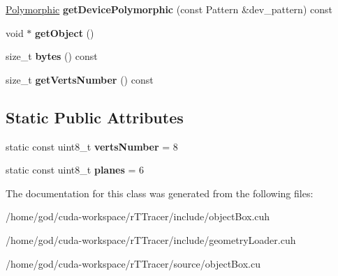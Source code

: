 \begin{DoxyCompactItemize}
\item 
\hyperlink{struct_polymorphic}{Polymorphic} {\bfseries get\+Device\+Polymorphic} (const Pattern \&dev\+\_\+pattern) const\hypertarget{class_cube_a91b7f2d2323140cfedbd92c61b636e56}{}\label{class_cube_a91b7f2d2323140cfedbd92c61b636e56}

\item 
void $\ast$ {\bfseries get\+Object} ()\hypertarget{class_cube_a9e68554bff4a2880f2ec981d2f8cb61a}{}\label{class_cube_a9e68554bff4a2880f2ec981d2f8cb61a}

\item 
size\+\_\+t {\bfseries bytes} () const\hypertarget{class_cube_a6dd4277f8d5956f74d73bb1ef988ae3a}{}\label{class_cube_a6dd4277f8d5956f74d73bb1ef988ae3a}

\item 
size\+\_\+t {\bfseries get\+Verts\+Number} () const\hypertarget{class_cube_a5cc25a88ab64cccb175db6f91241d92e}{}\label{class_cube_a5cc25a88ab64cccb175db6f91241d92e}

\end{DoxyCompactItemize}
\subsection*{Static Public Attributes}
\begin{DoxyCompactItemize}
\item 
static const uint8\+\_\+t {\bfseries verts\+Number} = 8\hypertarget{class_cube_ab6931618df3c78cc9ddbda09503db64e}{}\label{class_cube_ab6931618df3c78cc9ddbda09503db64e}

\item 
static const uint8\+\_\+t {\bfseries planes} = 6\hypertarget{class_cube_a4faff7ff2044bc2e83704dd1a7a7d268}{}\label{class_cube_a4faff7ff2044bc2e83704dd1a7a7d268}

\end{DoxyCompactItemize}


The documentation for this class was generated from the following files\+:\begin{DoxyCompactItemize}
\item 
/home/god/cuda-\/workspace/r\+T\+Tracer/include/object\+Box.\+cuh\item 
/home/god/cuda-\/workspace/r\+T\+Tracer/include/geometry\+Loader.\+cuh\item 
/home/god/cuda-\/workspace/r\+T\+Tracer/source/object\+Box.\+cu\end{DoxyCompactItemize}
